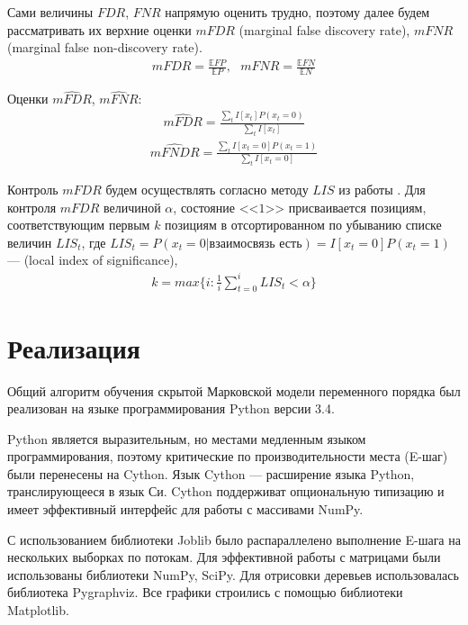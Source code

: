 \documentclass{matmex-diploma-custom}
\begin{document}
Сами величины $\textit{FDR}$, $\textit{FNR}$ напрямую оценить трудно, поэтому далее будем рассматривать их верхние оценки $\textit{mFDR}$ (marginal false discovery rate), $\textit{mFNR}$ (marginal false non-discovery rate).
\begin{align}
\textit{mFDR} = \frac{\mathbb{E}\textit{FP}}{\mathbb{E} \textit{P}}, 
~~~\textit{mFNR} = \frac{\mathbb{E}\textit{FN}}{\mathbb{E} \textit{N}}
\end{align}

Оценки $\hat{\textit{mFDR}}$, $\hat{\textit{mFNR}}$:
\begin{align}
\hat{\textit{mFDR}} = \frac{\sum_{t}{I[x_t]P(x_t=0)}}{\sum_{t}{I[x_t]}}
\label{formula:est_mFDR}
\end{align}
\begin{align}
\hat{\textit{mFNDR}} = \frac{\sum_{t}{I[x_t=0]P(x_t=1)}}{\sum_{t}{I[x_t=0]}}
\label{formula:est_mFNR}
\end{align}

Контроль $\textit{mFDR}$ будем осуществлять согласно методу $\textit{LIS}$ из работы \cite{Sun2009}. 
Для контроля $\textit{mFDR}$ величиной $\alpha$, состояние <<$1$>> присваивается позициям, соответствующим первым $ k $ позициям в отсортированном по убыванию списке величин $\textit{LIS}_{t}$, где
$\textit{LIS}_{t} = P(x_t=0| \text{взаимосвязь есть}) = I[x_t=0]P(x_t=1)$ --- (local index of significance),
\begin{align}
k = max\{i: \frac{1}{i}\sum_{t=0}^{i}{\textit{LIS}_{t}} < \alpha\}
\end{align}

\section{Реализация}
Общий алгоритм обучения скрытой Марковской модели переменного порядка был реализован на языке программирования Python версии 3.4.
 
Python является выразительным, но местами медленным языком программирования, поэтому критические по производительности места (E-шаг) были перенесены на Cython. Язык Cython --- расширение языка Python, транслирующееся в язык Си. Cython поддерживат опциональную типизацию и имеет эффективный интерфейс для работы с массивами NumPy.

С использованием библиотеки Joblib было распараллелено выполнение E-шага на нескольких выборках по потокам. Для эффективной работы с матрицами были использованы библиотеки NumPy, SciPy. Для отрисовки деревьев использовалась библиотека Pygraphviz. Все графики строились с помощью библиотеки Matplotlib.
\end{document}
